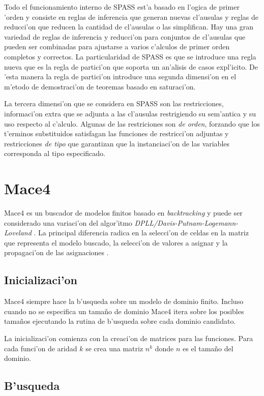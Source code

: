 Todo el funcionamiento interno de SPASS est'a basado en l'ogica de primer 'orden y consiste en reglas de inferencia que generan nuevas cl'ausulas y reglas de reducci'on que reducen la cantidad de cl'ausulas o las simplifican. Hay una gran variedad de reglas de inferencia y reducci'on para conjuntos de cl'ausulas que pueden ser combinadas para ajustarse a varios c'alculos de primer orden completos y correctos. La particularidad de SPASS es que se introduce una regla nueva que es la regla de partici'on que soporta un an'alisis de casos expl'icito. De 'esta manera la regla de partici'on introduce una segunda dimensi'on en el m'etodo de demostraci'on de teoremas basado en saturaci'on.

La tercera dimensi'on que se considera en SPASS son las restricciones, informaci'on extra que se adjunta a las cl'ausulas restrigiendo su sem'antica y su uso respecto al c'alculo. Algunas de las restriciones son \textit{de orden}, forzando que los t'erminos substituidos satisfagan las funciones de restricci'on adjuntas y restricciones \textit{de tipo} que garantizan que la instanciaci'on de las variables corresponda al tipo especificado.


\section{Mace4}

Mace4 es un buscador de modelos finitos basado en \textit{backtracking} y puede ser considerado una variaci'on del algor'itmo \textit{DPLL/Davis-Putnam-Logemann-Loveland} \cite{dpll}. La principal diferencia radica en la selecci'on de celdas en la matriz que representa el modelo buscado, la selecci'on de valores a asignar y la propagaci'on de las asignaciones \cite{mace4_manual}.

\subsection{Inicializaci'on}

Mace4 siempre hace la b'usqueda sobre un modelo de dominio finito. Incluso cuando no se especifica un tamaño de dominio Mace4 itera sobre los posibles tamaños ejecutando la rutina de b'usqueda sobre cada dominio candidato.

La inicializaci'on comienza con la creaci'on de matrices para las funciones. Para cada funci'on de aridad $k$ se crea una matriz $n^k$ donde $n$ es el tamaño del dominio.

\subsection{B'usqueda}

